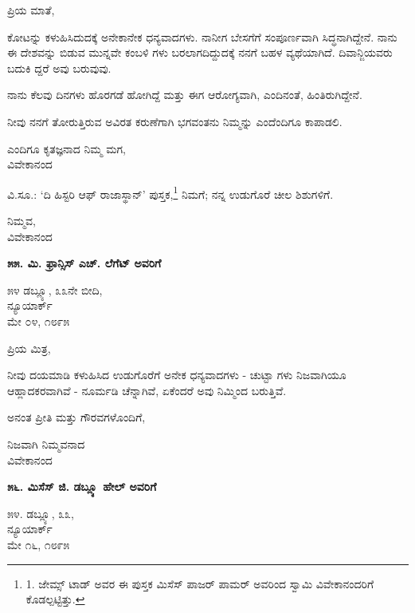 ಪ್ರಿಯ ಮಾತೆ,

ಕೋಟನ್ನು ಕಳುಹಿಸಿದುದಕ್ಕೆ ಅನೇಕಾನೇಕ ಧನ್ಯವಾದಗಳು. ನಾನೀಗ ಬೇಸಗೆಗೆ ಸಂಪೂರ್ಣವಾಗಿ ಸಿದ್ಧನಾಗಿದ್ದೇನೆ. ನಾನು ಈ ದೇಶವನ್ನು ಬಿಡುವ ಮುನ್ನವೇ ಕಂಬಳಿ ಗಳು ಬರಲಾಗದಿದ್ದುದಕ್ಕೆ ನನಗೆ ಬಹಳ ವ್ಯಥೆಯಾಗಿದೆ. ದಿವಾನ್ಜಿಯವರು ಬದುಕಿ ದ್ದರೆ ಅವು ಬರುವುವು.

ನಾನು ಕೆಲವು ದಿನಗಳು ಹೊರಗಡೆ ಹೋಗಿದ್ದೆ ಮತ್ತು ಈಗ ಆರೋಗ್ಯವಾಗಿ, ಎಂದಿನಂತೆ, ಹಿಂತಿರುಗಿದ್ದೇನೆ.

ನೀವು ನನಗೆ ತೋರುತ್ತಿರುವ ಅವಿರತ ಕರುಣೆಗಾಗಿ ಭಗವಂತನು ನಿಮ್ಮನ್ನು ಎಂದೆಂದಿಗೂ ಕಾಪಾಡಲಿ.

\begin{flushright}
ಎಂದಿಗೂ ಕೃತಜ್ಞನಾದ ನಿಮ್ಮ ಮಗ,\\ವಿವೇಕಾನಂದ
\end{flushright}

ವಿ.ಸೂ.: ‘ದಿ ಹಿಸ್ಟರಿ ಆಫ್ ರಾಜಾಸ್ಥಾನ್’ ಪುಸ್ತಕ,\footnote{1. ಜೇಮ್ಸ್ ಟಾಡ್ ಅವರ ಈ ಪುಸ್ತಕ ಮಿಸೆಸ್ ಪಾಜರ್ ಪಾಮರ್ ಅವರಿಂದ ಸ್ವಾಮಿ ವಿವೇಕಾನಂದರಿಗೆ ಕೊಡಲ್ಪಟ್ಟಿತ್ತು.} ನಿಮಗೆ; ನನ್ನ ಉಡುಗೊರೆ ಚೀಲ ಶಿಶುಗಳಿಗೆ.

\begin{flushright}
ನಿಮ್ಮವ,\\ವಿವೇಕಾನಂದ
\end{flushright}

\begin{center}
\textbf{೫೫. ಮಿ. ಫ್ರಾನ್ಸಿಸ್ ಎಚ್. ಲೆಗೆಟ್ ಅವರಿಗೆ}
\end{center}

\begin{flushright}
೫೪ ಡಬ್ಲ್ಯೂ, ೩೩ನೇ ಬೀದಿ,\\ನ್ಯೂಯಾರ್ಕ್\\ಮೇ ೦೪, ೧೮೯೫
\end{flushright}

ಪ್ರಿಯ ಮಿತ್ರ,

ನೀವು ದಯಮಾಡಿ ಕಳುಹಿಸಿದ ಉಡುಗೊರೆಗೆ ಅನೇಕ ಧನ್ಯವಾದಗಳು - ಚುಟ್ಟಾ ಗಳು ನಿಜವಾಗಿಯೂ ಆಹ್ಲಾದಕರವಾಗಿವೆ - ನೂರ್ಮಡಿ ಚೆನ್ನಾಗಿವೆ, ಏಕೆಂದರೆ ಅವು ನಿಮ್ಮಿಂದ ಬರುತ್ತಿವೆ.

ಅನಂತ ಪ್ರೀತಿ ಮತ್ತು ಗೌರವಗಳೊಂದಿಗೆ,

\begin{flushright}
ನಿಜವಾಗಿ ನಿಮ್ಮವನಾದ\\ವಿವೇಕಾನಂದ
\end{flushright}

\begin{center}
\textbf{೫೬. ಮಿಸೆಸ್ ಜಿ. ಡಬ್ಲ್ಯೂ ಹೇಲ್ ಅವರಿಗೆ}
\end{center}

\begin{flushright}
೫೪. ಡಬ್ಲ್ಯೂ, ೩೩,\\ನ್ಯೂಯಾರ್ಕ್\\ಮೇ ೧೬, ೧೮೯೫
\end{flushright}

